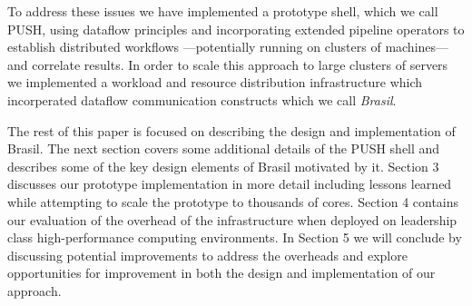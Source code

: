 To address these issues we have implemented a prototype shell, which
we call PUSH, using dataflow principles and incorporating extended
pipeline operators to establish distributed workflows ---potentially
running on clusters of machines--- and correlate results. 
In order to scale this approach to large clusters of servers we 
implemented a workload and resource distribution infrastructure which 
incorperated dataflow communication constructs which we call \emph{Brasil}.
%
%

The rest of this paper is focused on describing the design and implementation 
of Brasil. 
The next section covers some additional details of the PUSH shell and 
describes some of the key design elements of Brasil motivated by it.
Section 3 discusses our prototype implementation in more detail including
lessons learned while attempting to scale the prototype to thousands of cores.
Section 4 contains our evaluation of the overhead of the infrastructure 
when deployed on leadership class high-performance computing environments.
In Section 5 we will conclude by discussing potential improvements to 
address the overheads and explore opportunities for improvement in both 
the design and implementation of our approach.

